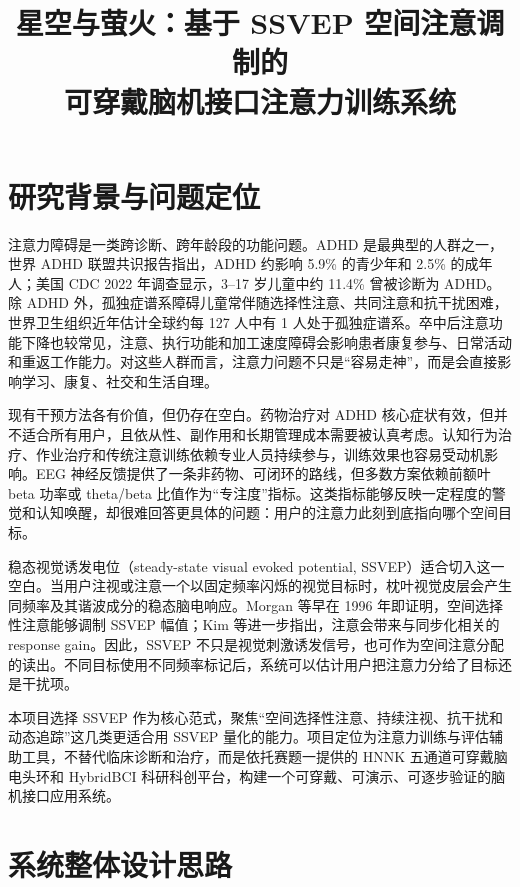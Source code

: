 \documentclass[UTF8,a4paper,zihao=5]{ctexart}
\title{\bfseries 星空与萤火：基于 SSVEP 空间注意调制的\\可穿戴脑机接口注意力训练系统}
\author{}
\date{}
\begin{document}
\maketitle
\vspace{-3.2em}

\section{研究背景与问题定位}

注意力障碍是一类跨诊断、跨年龄段的功能问题。ADHD 是最典型的人群之一，世界 ADHD 联盟共识报告指出，ADHD 约影响 5.9\% 的青少年和 2.5\% 的成年人\cite{faraone2021adhd}；美国 CDC 2022 年调查显示，3--17 岁儿童中约 11.4\% 曾被诊断为 ADHD\cite{cdc2024adhd}。除 ADHD 外，孤独症谱系障碍儿童常伴随选择性注意、共同注意和抗干扰困难，世界卫生组织近年估计全球约每 127 人中有 1 人处于孤独症谱系\cite{who2025autism}。卒中后注意功能下降也较常见，注意、执行功能和加工速度障碍会影响患者康复参与、日常活动和重返工作能力\cite{gillespie2015stroke}。对这些人群而言，注意力问题不只是“容易走神”，而是会直接影响学习、康复、社交和生活自理。

现有干预方法各有价值，但仍存在空白。药物治疗对 ADHD 核心症状有效，但并不适合所有用户，且依从性、副作用和长期管理成本需要被认真考虑。认知行为治疗、作业治疗和传统注意训练依赖专业人员持续参与，训练效果也容易受动机影响。EEG 神经反馈提供了一条非药物、可闭环的路线，但多数方案依赖前额叶 beta 功率或 theta/beta 比值作为“专注度”指标。这类指标能够反映一定程度的警觉和认知唤醒，却很难回答更具体的问题：用户的注意力此刻到底指向哪个空间目标。

稳态视觉诱发电位（steady-state visual evoked potential, SSVEP）适合切入这一空白。当用户注视或注意一个以固定频率闪烁的视觉目标时，枕叶视觉皮层会产生同频率及其谐波成分的稳态脑电响应。Morgan 等早在 1996 年即证明，空间选择性注意能够调制 SSVEP 幅值\cite{morgan1996ssvep}；Kim 等进一步指出，注意会带来与同步化相关的 response gain\cite{kim2007gain}。因此，SSVEP 不只是视觉刺激诱发信号，也可作为空间注意分配的读出。不同目标使用不同频率标记后，系统可以估计用户把注意力分给了目标还是干扰项。

本项目选择 SSVEP 作为核心范式，聚焦“空间选择性注意、持续注视、抗干扰和动态追踪”这几类更适合用 SSVEP 量化的能力。项目定位为注意力训练与评估辅助工具，不替代临床诊断和治疗，而是依托赛题一提供的 HNNK 五通道可穿戴脑电头环和 HybridBCI 科研科创平台，构建一个可穿戴、可演示、可逐步验证的脑机接口应用系统。

\section{系统整体设计思路}
\end{document}
